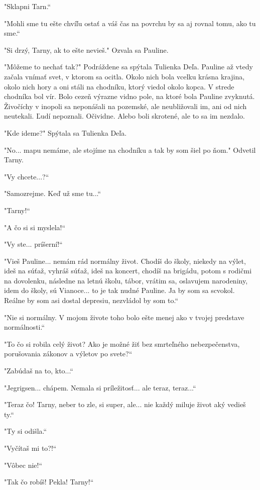 \documentclass{book}
\begin{document}
"$ $Sklapni Tarn.“

"$ $Mohli sme tu ešte chvíľu ostať a váš čas na povrchu by sa aj rovnal tomu, ako tu sme.“

"$ $Si drzý, Tarny, ak to ešte nevieš."$ $ Ozvala sa Pauline.

"$ $Môžeme to nechať tak?"$ $ Podráždene sa spýtala Tulienka Deľa. Pauline až vtedy začala vnímať svet, v ktorom sa ocitla. Okolo nich bola vcelku krásna krajina, okolo nich hory a oni stáli na chodníku, ktorý viedol okolo kopca. V strede chodníka bol vír. Bolo cezeň výrazne vidno pole, na ktoré bola Pauline zvyknutá. Živočíchy v inopoli sa neponášali na pozemské, ale neubližovali im, ani od nich neutekali. Ľudí nepoznali. Očividne. Alebo boli skrotené, ale to sa im nezdalo.

"$ $Kde ideme?"$ $ Spýtala sa Tulienka Deľa.

"$ $No... mapu nemáme, ale stojíme na chodníku a tak by som šiel po ňom."$ $ Odvetil Tarny.

"$ $Vy chcete...?“

"$ $Samozrejme. Keď už sme tu...“

"$ $Tarny!“

"$ $A čo si si myslela!“

"$ $Vy ste... príšerní!“

"$ $Vieš Pauline... nemám rád normálny život. Chodíš do školy, niekedy na výlet, ideš na súťaž, vyhráš súťaž, ideš na koncert, chodíš na brigádu, potom s rodičmi na dovolenku, následne na letnú školu, tábor, vrátim sa, oslavujem narodeniny, idem do školy, sú Vianoce... to je tak nudné Pauline. Ja by som sa scvokol. Reálne by som asi dostal depresiu, nezvládol by som to.“

"$ $Nie si normálny. V mojom živote toho bolo ešte menej ako v tvojej predstave normálnosti.“

"$ $To čo si robila celý život? Ako je možné žiť bez smrteľného nebezpečenstva, porušovania zákonov a výletov po svete?“

"$ $Zabúdaš na to, kto...“

"$ $Jegrigsen... chápem. Nemala si príležitosť... ale teraz, teraz...“

"$ $Teraz čo! Tarny, neber to zle, si super, ale... nie každý miluje život aký vedieš ty.“

"$ $Ty si odišla.“

"$ $Vyčítaš mi to?!“

"$ $Vôbec nie!“

"$ $Tak čo robíš! Pekla! Tarny!“
\end{document}

